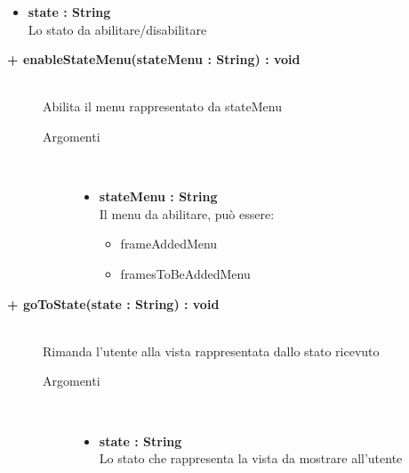 \begin{description}
\begin{description}
\begin{description}
\begin{itemize}
					\item \textbf{state : String			} \hfill \\
					Lo stato da abilitare/disabilitare
					
				\end{itemize}
		\end{description}
	\end{description}
	
	\begin{description}
		\item[\textbf{\color{blue}+ enableStateMenu(stateMenu : String) : void			}] \hfill \\
			Abilita il menu rappresentato da stateMenu
			
		\begin{description}
			\item[Argomenti] \hfill \\
				\begin{itemize}
				
					\item \textbf{stateMenu : String			} \hfill \\
					Il menu da abilitare, può essere: 
					\begin{itemize}
						\item frameAddedMenu
						\item framesToBeAddedMenu
					\end{itemize}
					
				\end{itemize}
		\end{description}
	\end{description}
	
	\begin{description}
		\item[\textbf{\color{blue}+ goToState(state : String) : void			}] \hfill \\
			Rimanda l'utente alla vista rappresentata dallo stato ricevuto
			
		\begin{description}
			\item[Argomenti] \hfill \\
				\begin{itemize}
				
					\item \textbf{state : String			} \hfill \\
					Lo stato che rappresenta la vista da mostrare all'utente
					
				\end{itemize}
		\end{description}
	\end{description}
	
			

\end{description}